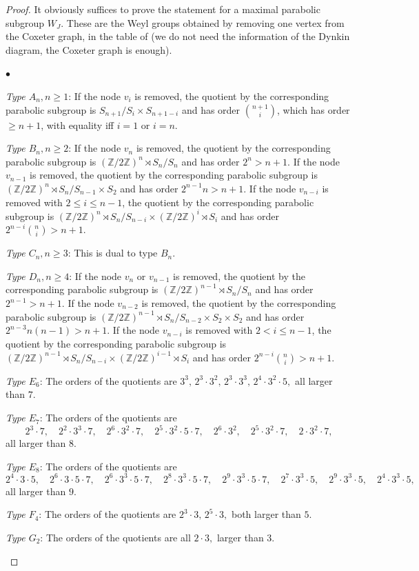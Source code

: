 \documentclass[reqno, 10pt]{amsart}
\newcommand{\BZ}{\ensuremath{\mathbb {Z}}\xspace}
\theoremstyle{definition}
\newenvironment{altitemize}
   {\begin{list}
      {$\bullet$}
      {\setlength{\labelwidth}{0pt}
	   \setlength{\itemindent}{5pt}
       \setlength{\labelsep}{5pt}
       \setlength{\leftmargin}{0pt}
       \setlength{\itemsep}{\the\smallskipamount}
      }}
   {\end{list}}
\numberwithin{equation}{subsection}
\numberwithin{subsubsection}{subsection}
\begin{document}
\begin{proof}
It obviously suffices to prove the statement for a maximal parabolic subgroup $W_J$. These are the Weyl groups obtained by removing one vertex from the Coxeter graph, in the table of \cite[ch. VI, \S 4, 1]{Bou} (we do not need the information of the Dynkin diagram, the Coxeter graph is enough).
\begin{altitemize}
\item \emph{Type $A_n, n\geq 1$}: If the node $v_i$ is removed, the  quotient by the corresponding parabolic subgroup is $S_{n+1}/S_i\times S_{n+1-i}$ and has order $\binom{n+1}{i}$, which has order $\geq n+1$, with equality iff $i=1$ or $i=n$.
\item \emph{Type $B_n, n\geq 2$}: If the node $v_n$ is removed, the  quotient by the corresponding parabolic subgroup is $(\BZ/2\BZ)^n\rtimes S_{n}/S_n$ and has order $2^n>n+1$. If the node $v_{n-1}$ is removed, the  quotient by the corresponding parabolic subgroup is $(\BZ/2\BZ)^n\rtimes S_{n}/S_{n-1}\times S_2$ and has order $2^{n-1}n>n+1$. If the node $v_{n-i}$ is removed with $2\leq i\leq n-1$, the  quotient by the corresponding parabolic subgroup is $(\BZ/2\BZ)^n\rtimes S_{n}/S_{n-i}\times (\BZ/2\BZ)^{i}\rtimes S_{i}$ and has order $2^{n-i}\binom{n}{i}>n+1$. 
\item\emph{Type $C_n, n\geq 3$}: This is dual to type $B_n$.
\item\emph{Type $D_n, n\geq 4$}: If the node $v_n$ or $v_{n-1}$ is removed, the  quotient by the corresponding parabolic subgroup is $(\BZ/2\BZ)^{n-1}\rtimes S_{n}/S_{n}$ and has order $2^{n-1}>n+1$.  If the node $v_{n-2}$ is removed, the  quotient by the corresponding parabolic subgroup is $(\BZ/2\BZ)^{n-1}\rtimes S_{n}/S_{n-2}\times S_2\times S_2$ and has order $2^{n-3}n(n-1)>n+1$. If the node $v_{n-i}$ is removed with $2<i\leq n-1$, the  quotient by the corresponding parabolic subgroup is $(\BZ/2\BZ)^{n-1}\rtimes S_{n}/S_{n-i}\times (\BZ/2\BZ)^{i-1}\rtimes S_{i}$ and has order $2^{n-i}\binom{n}{i}>n+1$. 
\item\emph{Type $E_6$}: The orders of the quotients are
$
3^3, \, 2^3\cdot 3^2, \,  2^3\cdot 3^3,\, 2^4\cdot 3^2\cdot 5,
$
all larger than $7$. 
\item\emph{Type $E_7$}: The orders of the quotients are
$$
2^3\cdot7, \quad 2^2\cdot 3^3\cdot  7,\quad 2^6\cdot 3^2\cdot 7, \quad 2^5\cdot 3^2\cdot 5\cdot 7, \quad 2^6\cdot 3^2, \quad 2^5\cdot 3^2\cdot 7, \quad 2\cdot 3^2\cdot 7,
$$
all larger than $8$. 
\item\emph{Type $E_8$}: The orders of the quotients are
$$
2^4\cdot 3\cdot 5, \quad 2^6\cdot 3\cdot 5\cdot 7, \quad 2^6\cdot 3^3\cdot 5\cdot 7,\quad 2^8\cdot 3^3\cdot 5\cdot 7, \quad 2^9\cdot 3^3\cdot 5\cdot 7,\quad
2^7\cdot 3^3\cdot 5, \quad 2^9\cdot 3^3\cdot 5, \quad 2^4\cdot 3^3\cdot 5, 
$$
all larger than $9$. 
\item\emph{Type $F_4$}: The orders of the quotients are
$
2^3\cdot 3,\, 2^5\cdot 3, 
$
both larger than $5$. 
\item\emph{Type $G_2$}: The orders of the quotients are all
$
2\cdot 3,
$
larger than $3$. \end{altitemize}
\end{proof}
\end{document}
